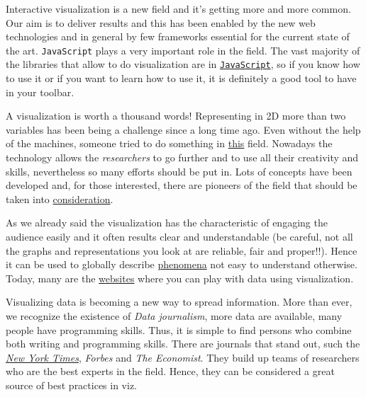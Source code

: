 Interactive visualization is a new field and it's getting more and more common. Our aim is to deliver results and this has been enabled by the new web technologies and in general by few frameworks essential for the current state of the art. \texttt{JavaScript} plays a very important role in the field. The vast majority of the libraries that allow to do visualization are in \href{https://www.codecademy.com/learn/javascript}{\texttt{JavaScript}}, so if you know how to use it or if you want to learn how to use it, it is definitely a good tool to have in your toolbar. 

A visualization is worth a thousand words! Representing in 2D more than two variables has been being a challenge since a long time ago. Even without the help of the machines, someone tried to do something in \href{https://en.wikipedia.org/wiki/Charles\_Joseph\_Minard}{this} field. Nowadays the technology allows the \emph{researchers} to go further and to use all their creativity and skills, nevertheless so many efforts should be put in. Lots of concepts have been developed and, for those interested, there are pioneers of the field that should be taken into \href{https://en.wikipedia.org/wiki/Edward\_Tufte}{consideration}.

As we already said the visualization has the characteristic of engaging the audience easily and it often results clear and understandable (be careful, not all the graphs and representations you look at are reliable, fair and proper!!). Hence it can be used to globally describe \href{https://www.ted.com/talks/hans\_rosling\_shows\_the\_best\_stats\_you\_ve\_ever\_seen}{phenomena} not easy to understand otherwise. Today, many are the \href{https://www.gapminder.org/tools/#\_chart-type=bubbles\&state\_time\_end=2015;\&entities\%2F\_minimap\_show\_geo.cat@=main\%2F\_religion\%2F\_2008;;;\&marker_color\_which=geo.main\%2F\_religion\%2F\_2008}{websites} where you can play with data using visualization.

Visualizing data is becoming a new way to spread information. More than ever, we recognize the existence of \emph{Data journalism}, more data are available, many people have programming skills. Thus, it is simple to find persons who combine both writing and programming skills. There are journals that stand out, such the \href{http://www.nytimes.com/interactive/2014/06/05/upshot/how-the-recession-reshaped-the-economy-in-255-charts.html?\_r=0}{\emph{New York Times}}, \emph{Forbes} and \emph{The Economist}. They build up teams of researchers who are the best experts in the field. Hence, they can be considered a great source of best practices in viz.


